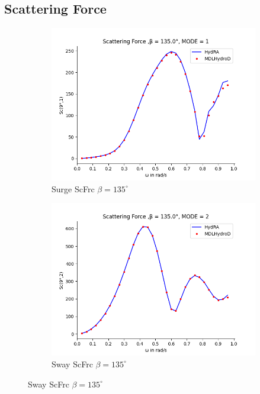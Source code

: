 \subsection{Scattering Force}
\begin{figure}[H]
    \centering
    \begin{subfigure}[b]{0.45\textwidth}
        \includegraphics[width=\textwidth]{plots/kcs/sc/sc1.png}
        \caption{Surge ScFrc $\beta = 135^{\circ}$}
    \end{subfigure}
    \begin{subfigure}[b]{0.45\textwidth}
        \includegraphics[width=\textwidth]{plots/kcs/sc/sc2.png}
        \caption{Sway ScFrc $\beta = 135^{\circ}$}
    \end{subfigure}

\end{figure}
